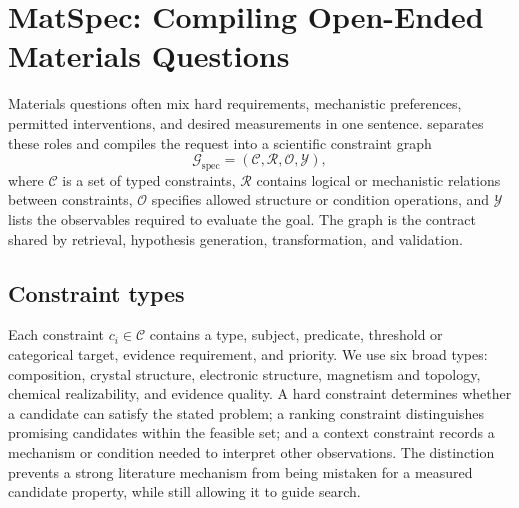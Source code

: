 \section{MatSpec: Compiling Open-Ended Materials Questions}
\label{sec:matspec}

Materials questions often mix hard requirements, mechanistic preferences, permitted interventions, and desired measurements in one sentence.  \matspec separates these roles and compiles the request into a scientific constraint graph
\begin{equation}
    \mathcal{G}_{\mathrm{spec}}=(\mathcal{C},\mathcal{R},\mathcal{O},\mathcal{Y}),
\end{equation}
where $\mathcal{C}$ is a set of typed constraints, $\mathcal{R}$ contains logical or mechanistic relations between constraints, $\mathcal{O}$ specifies allowed structure or condition operations, and $\mathcal{Y}$ lists the observables required to evaluate the goal.  The graph is the contract shared by retrieval, hypothesis generation, transformation, and validation.

\subsection{Constraint types}

Each constraint $c_i\in\mathcal{C}$ contains a type, subject, predicate, threshold or categorical target, evidence requirement, and priority.  We use six broad types: composition, crystal structure, electronic structure, magnetism and topology, chemical realizability, and evidence quality.  A hard constraint determines whether a candidate can satisfy the stated problem; a ranking constraint distinguishes promising candidates within the feasible set; and a context constraint records a mechanism or condition needed to interpret other observations.  The distinction prevents a strong literature mechanism from being mistaken for a measured candidate property, while still allowing it to guide search.

